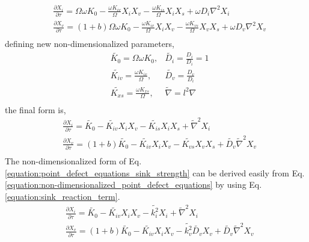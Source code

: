 \documentclass[utf8]{frontiersSCNS} %
\begin{document}
    \begin{equation}
      \begin{aligned}
        &\frac{\partial X_i}{\partial\tau} = \Omega\omega K_0 - \frac{\omega K_{iv}}{\Omega}X_iX_v - \frac{\omega K_{is}}{\Omega}X_iX_s + \omega D_i\nabla^2 X_i\\
        &\frac{\partial X_v}{\partial\tau} = (1+b)\Omega\omega K_0 - \frac{\omega K_{iv}}{\Omega}X_iX_v - \frac{\omega K_{vs}}{\Omega}X_vX_s + \omega D_v\nabla^2 X_v\\
      \end{aligned}
      \label{equation:non-dimensionalized_point_defect_equations}
    \end{equation}
    defining new non-dimensionalized parameters,\\
    \begin{equation}
      \begin{aligned}
        &\widetilde{K_0}=\Omega\omega K_0,
            &\widetilde{D_i}=\frac{D_i}{D_i}=1\\
        &\widetilde{K_{iv}}=\frac{\omega K_{iv}}{\Omega},
            &\widetilde{D_v}=\frac{D_v}{D_i}\\
        &\widetilde{K_{xs}}=\frac{\omega K_{xs}}{\Omega}, 
            &\widetilde{\nabla}=l^2\nabla\\
      \end{aligned}
      \label{equation:non-dimensionalized_parameters}
    \end{equation}
    the final form is,\\
    \begin{equation}
      \begin{aligned}
        &\frac{\partial X_i}{\partial\tau} = \widetilde{K_0} - \widetilde{K_{iv}}X_iX_v - \widetilde{K_{is}}X_iX_s + \widetilde{\nabla}^2 X_i\\
        &\frac{\partial X_v}{\partial\tau} = (1+b)\widetilde{K_0} - \widetilde{K_{iv}}X_iX_v - \widetilde{K_{vs}}X_vX_s + \widetilde{D_v}\widetilde{\nabla}^2 X_v\\
      \end{aligned}
      \label{equation:non-dimensionalized_point_defect_equations}
    \end{equation}
    The non-dimensionalized form of Eq. \ref{equation:point_defect_equations_sink_strength} can be derived easily from Eq. \ref{equation:non-dimensionalized_point_defect_equations} by using Eq. \ref{equation:sink_reaction_term}.
    \begin{equation}
      \begin{aligned}
        &\frac{\partial X_i}{\partial\tau} = \widetilde{K_0} - \widetilde{K_{iv}}X_iX_v - \widetilde{k_{i}^2}X_i + \widetilde{\nabla}^2 X_i\\
        &\frac{\partial X_v}{\partial\tau} = (1+b)\widetilde{K_0} - \widetilde{K_{iv}}X_iX_v - \widetilde{k_{v}^2}\widetilde{D_v}X_v + \widetilde{D_v}\widetilde{\nabla}^2 X_v\\
      \end{aligned}
      \label{equation:non-dimensionalized_point_defect_equations_sink_strength}
    \end{equation}
\end{document}
